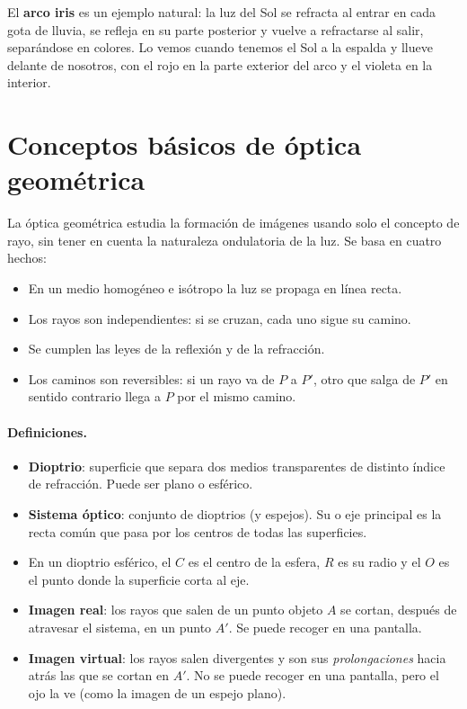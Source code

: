 El \textbf{arco iris} es un ejemplo natural: la luz del Sol se refracta al entrar en cada gota de lluvia, se refleja en su
parte posterior y vuelve a refractarse al salir, separándose en colores. Lo vemos cuando tenemos el Sol a la espalda y
llueve delante de nosotros, con el rojo en la parte exterior del arco y el violeta en la interior.

\section{Conceptos básicos de óptica geométrica}\label{sec:opt-conceptos}

La óptica geométrica estudia la formación de imágenes usando solo el concepto de rayo, sin tener en cuenta la naturaleza
ondulatoria de la luz. Se basa en cuatro hechos:
\begin{itemize}
    \item En un medio homogéneo e isótropo la luz se propaga en línea recta.
    \item Los rayos son independientes: si se cruzan, cada uno sigue su camino.
    \item Se cumplen las leyes de la reflexión y de la refracción.
    \item Los caminos son reversibles: si un rayo va de \(P\) a \(P'\), otro que salga de \(P'\) en sentido contrario
    llega a \(P\) por el mismo camino.
\end{itemize}

\paragraph{Definiciones.}
\begin{itemize}
    \item \textbf{Dioptrio}: superficie que separa dos medios transparentes de distinto índice de refracción. Puede ser
    plano o esférico.
    \item \textbf{Sistema óptico}: conjunto de dioptrios (y espejos). Su  o eje principal es la recta
    común que pasa por los centros de todas las superficies.
    \item En un dioptrio esférico, el  \(C\) es el centro de la esfera, \(R\) es su radio y el
     \(O\) es el punto donde la superficie corta al eje.
    \item \textbf{Imagen real}: los rayos que salen de un punto objeto \(A\) se cortan, después de atravesar el sistema, en
    un punto \(A'\). Se puede recoger en una pantalla.
    \item \textbf{Imagen virtual}: los rayos salen divergentes y son sus \emph{prolongaciones} hacia atrás las que se cortan
    en \(A'\). No se puede recoger en una pantalla, pero el ojo la ve (como la imagen de un espejo plano).
\end{itemize}

